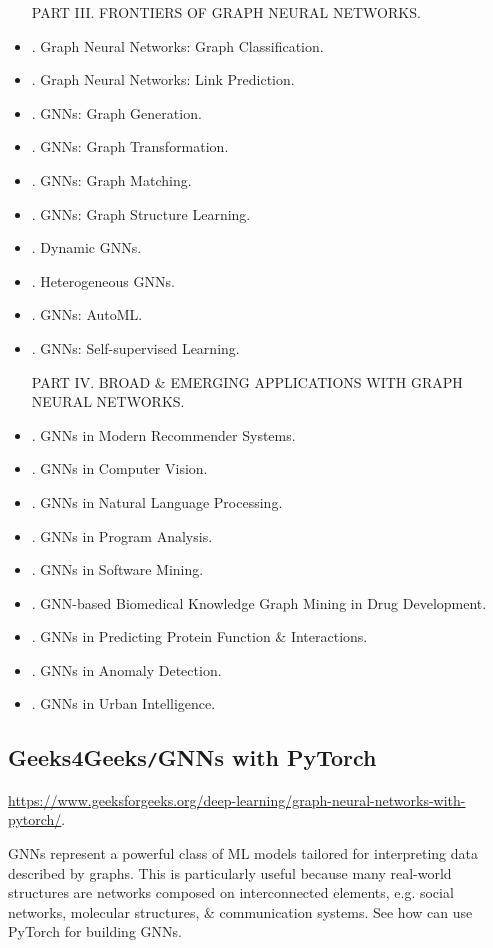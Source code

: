\documentclass{article}
\begin{document}
\begin{itemize}
    PART III. FRONTIERS OF GRAPH NEURAL NETWORKS.
    \item {. Graph Neural Networks: Graph Classification.}
    \item {. Graph Neural Networks: Link Prediction.}
    \item {. GNNs: Graph Generation.}
    \item {. GNNs: Graph Transformation.}
    \item {. GNNs: Graph Matching.}
    \item {. GNNs: Graph Structure Learning.}
    \item {. Dynamic GNNs.}
    \item {. Heterogeneous GNNs.}
    \item {. GNNs: AutoML.}
    \item {. GNNs: Self-supervised Learning.}

    PART IV. BROAD \& EMERGING APPLICATIONS WITH GRAPH NEURAL NETWORKS.
    \item {. GNNs in Modern Recommender Systems.}
    \item {. GNNs in Computer Vision.}
    \item {. GNNs in Natural Language Processing.}
    \item {. GNNs in Program Analysis.}
    \item {. GNNs in Software Mining.}
    \item {. GNN-based Biomedical Knowledge Graph Mining in Drug Development.}
    \item {. GNNs in Predicting Protein Function \& Interactions.}
    \item {. GNNs in Anomaly Detection.}
    \item {. GNNs in Urban Intelligence.}
\end{itemize}


\subsection{Geeks4Geeks{\tt/}GNNs with PyTorch}
\url{https://www.geeksforgeeks.org/deep-learning/graph-neural-networks-with-pytorch/}.

GNNs represent a powerful class of ML models tailored for interpreting data described by graphs. This is particularly useful because many real-world structures are networks composed on interconnected elements, e.g. social networks, molecular structures, \& communication systems. See how can use PyTorch for building GNNs.
\end{document}
